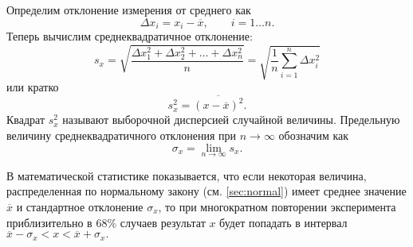 

Определим отклонение измерения от среднего как
\[
\Delta x_{i}=x_{i}-\overline{x},\qquad i=1\ldots n.
\]
Теперь вычислим среднеквадратичное отклонение:
\begin{equation}
    s_{x}=\sqrt{\frac{\Delta x_{1}^{2}+\Delta x_{2}^{2}+\ldots+\Delta x_{n}^{2}}{n}}=\sqrt{\frac{1}{n}\sum\limits _{i=1}^{n}\Delta x_{i}^{2}}\label{eq:sigma}
\end{equation}
или кратко
\begin{equation}
    \boxed{s_{x}^{2}=\overline{\left(x-\overline{x}\right)^{2}}}.\label{eq:sigma_s}
\end{equation}
Квадрат $s_{x}^{2}$ называют выборочной дисперсией случайной величины. Предельную величину среднеквадратичного отклонения
при $n\to\infty$ обозначим как
\[
\sigma_{x}=\lim\limits _{n\to\infty}s_{x}.
\]

В математической статистике показывается, что если некоторая величина, распределенная по нормальному закону (см. \ref{sec:normal}) имеет среднее значение $\overline{x}$ и стандартное отклонение $\sigma_x$, то при многократном повторении эксперимента приблизительно в 68\% случаев результат $x$ будет попадать в интервал $\overline{x}-\sigma_{x}<x<\overline{x}+\sigma_{x}.$



